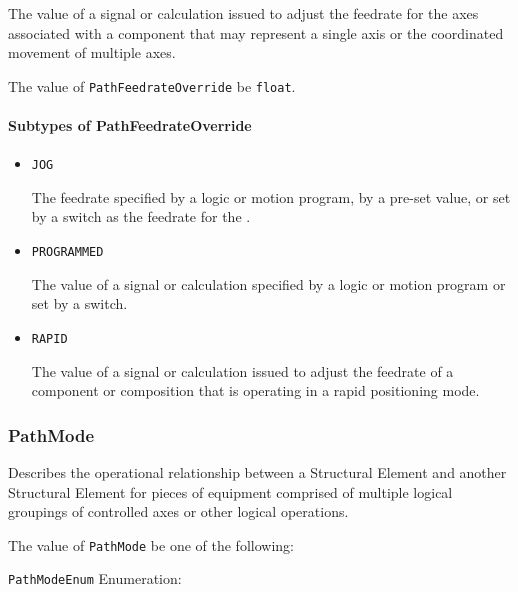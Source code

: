 The value of a signal or calculation issued to adjust the feedrate for the axes associated with a  component that may represent a single axis or the coordinated movement of multiple axes.


The value of \texttt{PathFeedrateOverride} \MUST be \texttt{float}.


\paragraph{Subtypes of PathFeedrateOverride}\mbox{}
\label{sec:Subtypes of PathFeedrateOverride}

\begin{itemize}

\item \texttt{JOG}


The feedrate specified by a logic or motion program, by a pre-set value, or set by a switch as the feedrate for the . 

\item \texttt{PROGRAMMED}


The value of a signal or calculation specified by a logic or motion program or set by a switch.

\item \texttt{RAPID}


The value of a signal or calculation issued to adjust the feedrate of a component or composition that is operating in a rapid positioning mode.


\end{itemize}






\subsubsection{PathMode}
\label{sec:PathMode}



Describes the operational relationship between a  \gls{Structural Element} and another  \gls{Structural Element} for pieces of equipment comprised of multiple logical groupings of controlled axes or other logical operations.


The value of \texttt{PathMode} \MUST be one of the following: 


\texttt{PathModeEnum} Enumeration:

